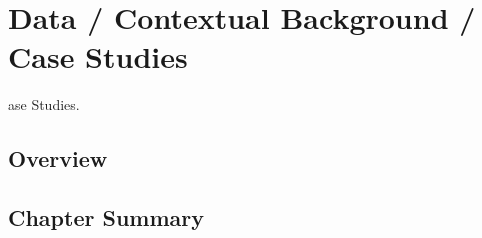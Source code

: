 \chapter{Data / Contextual Background / Case Studies}\label{ch04}

ase Studies.

\section{Overview}


\section{Chapter Summary}
